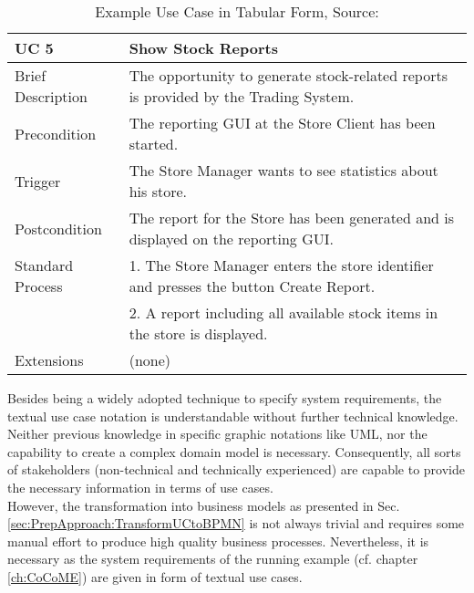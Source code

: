 \begin{table}[!h]
	\centering
	\begin{tabularx}{\textwidth}{|l||X|}
		\hline
		UC 5 & Show Stock Reports \\ 
		\hline
		Brief Description &  The opportunity to generate stock-related reports is provided
		by the Trading System. \\
		\hline
		Precondition & The reporting GUI at the Store Client has been started. \\
		\hline
		Trigger & The Store Manager wants to see statistics about his store. \\
		\hline
		Postcondition & The report for the Store has been generated and is displayed on
		the reporting GUI. \\
		\hline 
		Standard Process &
		
		1. The Store Manager enters the store identifier and presses the button Create
		Report.  \\
		& 2. A report including all available stock items in the store is displayed. \\  
		\hline
		Extensions & (none) \\ \hline
		
		
	\end{tabularx}
	\caption{Example Use Case in Tabular Form, Source: \cite{CoCoMEOld}}
	\label{tab:exampleUseCase}
	
\end{table}

\noindent
Besides being a widely adopted technique to specify system requirements, the textual use case notation is understandable without further technical knowledge. Neither previous knowledge in specific graphic notations like UML, nor the capability to create a complex domain model is necessary. Consequently, all sorts of stakeholders (non-technical and technically experienced) are capable to provide the necessary information in terms of use cases. \\
However, the transformation into business models as presented in Sec.\ref{sec:PrepApproach:TransformUCtoBPMN} is not always trivial and requires some manual effort to produce high quality business processes. Nevertheless, it is necessary as the system requirements of the running example (cf. chapter \ref{ch:CoCoME}) are given in form of textual use cases.





